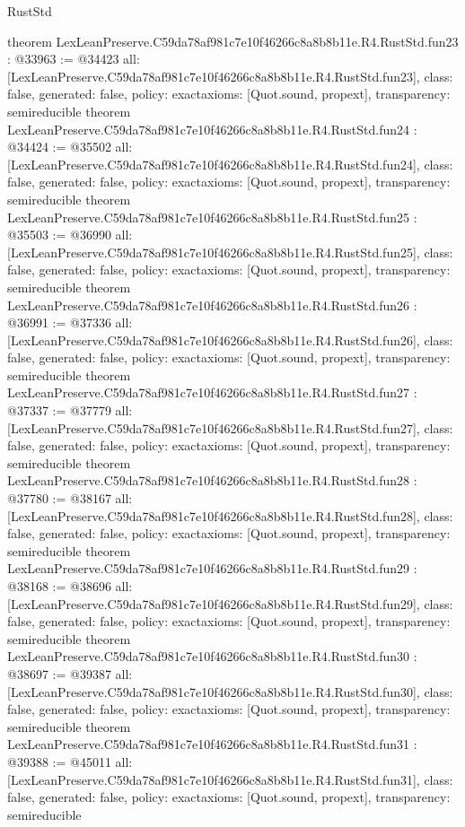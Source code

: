 \begin{lexlean}{RustStd}
\begin{coremodule}
{}
theorem LexLeanPreserve.C59da78af981c7e10f46266c8a8b8b11e.R4.RustStd.fun23 : @33963 := @34423 {
  all: [LexLeanPreserve.C59da78af981c7e10f46266c8a8b8b11e.R4.RustStd.fun23],
  class: false,
  generated: false,
  policy: exact{axioms: [Quot.sound, propext]},
  transparency: semireducible
}
theorem LexLeanPreserve.C59da78af981c7e10f46266c8a8b8b11e.R4.RustStd.fun24 : @34424 := @35502 {
  all: [LexLeanPreserve.C59da78af981c7e10f46266c8a8b8b11e.R4.RustStd.fun24],
  class: false,
  generated: false,
  policy: exact{axioms: [Quot.sound, propext]},
  transparency: semireducible
}
theorem LexLeanPreserve.C59da78af981c7e10f46266c8a8b8b11e.R4.RustStd.fun25 : @35503 := @36990 {
  all: [LexLeanPreserve.C59da78af981c7e10f46266c8a8b8b11e.R4.RustStd.fun25],
  class: false,
  generated: false,
  policy: exact{axioms: [Quot.sound, propext]},
  transparency: semireducible
}
theorem LexLeanPreserve.C59da78af981c7e10f46266c8a8b8b11e.R4.RustStd.fun26 : @36991 := @37336 {
  all: [LexLeanPreserve.C59da78af981c7e10f46266c8a8b8b11e.R4.RustStd.fun26],
  class: false,
  generated: false,
  policy: exact{axioms: [Quot.sound, propext]},
  transparency: semireducible
}
theorem LexLeanPreserve.C59da78af981c7e10f46266c8a8b8b11e.R4.RustStd.fun27 : @37337 := @37779 {
  all: [LexLeanPreserve.C59da78af981c7e10f46266c8a8b8b11e.R4.RustStd.fun27],
  class: false,
  generated: false,
  policy: exact{axioms: [Quot.sound, propext]},
  transparency: semireducible
}
theorem LexLeanPreserve.C59da78af981c7e10f46266c8a8b8b11e.R4.RustStd.fun28 : @37780 := @38167 {
  all: [LexLeanPreserve.C59da78af981c7e10f46266c8a8b8b11e.R4.RustStd.fun28],
  class: false,
  generated: false,
  policy: exact{axioms: [Quot.sound, propext]},
  transparency: semireducible
}
theorem LexLeanPreserve.C59da78af981c7e10f46266c8a8b8b11e.R4.RustStd.fun29 : @38168 := @38696 {
  all: [LexLeanPreserve.C59da78af981c7e10f46266c8a8b8b11e.R4.RustStd.fun29],
  class: false,
  generated: false,
  policy: exact{axioms: [Quot.sound, propext]},
  transparency: semireducible
}
theorem LexLeanPreserve.C59da78af981c7e10f46266c8a8b8b11e.R4.RustStd.fun30 : @38697 := @39387 {
  all: [LexLeanPreserve.C59da78af981c7e10f46266c8a8b8b11e.R4.RustStd.fun30],
  class: false,
  generated: false,
  policy: exact{axioms: [Quot.sound, propext]},
  transparency: semireducible
}
theorem LexLeanPreserve.C59da78af981c7e10f46266c8a8b8b11e.R4.RustStd.fun31 : @39388 := @45011 {
  all: [LexLeanPreserve.C59da78af981c7e10f46266c8a8b8b11e.R4.RustStd.fun31],
  class: false,
  generated: false,
  policy: exact{axioms: [Quot.sound, propext]},
  transparency: semireducible
}
\end{coremodule}
\end{lexlean}
